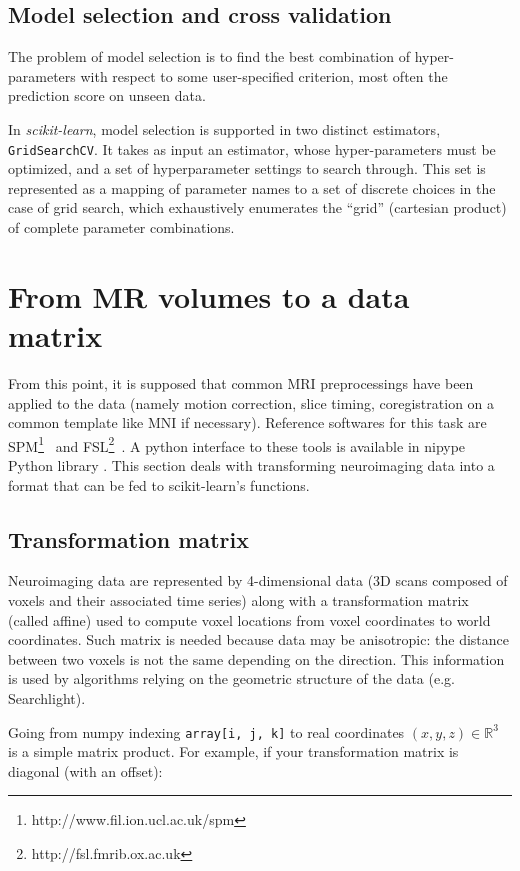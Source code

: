 \documentclass{frontiersSCNS} %
\newcounter{x}
\newcounter{y}
\newcounter{z}
\begin{document}
\subsection{Model selection and cross validation}

The problem of model selection is to find the best
combination of hyper-parameters with respect to some user-specified criterion,
most often the prediction score on unseen data.

In {\em scikit-learn}, model selection is supported in two distinct
estimators, \texttt{GridSearchCV}. It takes
as input an estimator, whose hyper-parameters must be
optimized, and a set of hyperparameter settings to search through. This set is
represented as a mapping of parameter names to a set of discrete choices in
the case of grid search, which exhaustively enumerates the ``grid'' (cartesian
product) of complete parameter combinations.

\section{From MR volumes to a data matrix}

From this point, it is supposed that common MRI preprocessings have been applied
to the data (namely motion correction, slice timing, coregistration on a common template like
MNI if necessary). Reference softwares for this task are
SPM\footnote{http://www.fil.ion.ucl.ac.uk/spm}~\citep{friston2007} and
FSL\footnote{http://fsl.fmrib.ox.ac.uk}~\citep{smith2004}. A python interface to
these tools is available in nipype Python library \citep{gargolewski2011}.
This section deals with transforming neuroimaging data into a format that can be
fed to scikit-learn's functions.


\subsection{Transformation matrix}

Neuroimaging data are represented by 4-dimensional data (3D scans composed of
voxels and their associated time series) along with a transformation matrix
(called affine) used to compute voxel locations from voxel coordinates to
world coordinates.
Such matrix is needed because data may be anisotropic: the distance between
two voxels is not the same depending on the direction.
This information is used by algorithms relying on the geometric structure of the
data (e.g. Searchlight).

Going from
numpy indexing \verb!array[i, j, k]! to real coordinates $(x, y, z) \in
\mathbb{R}^3$ is a simple matrix product. For example, if your transformation
matrix is diagonal (with an offset):
\end{document}
